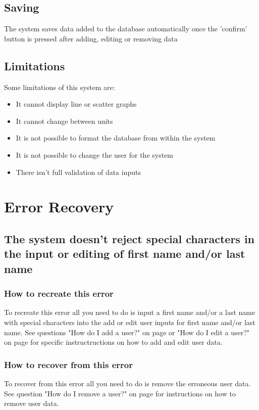 \subsection{Saving}
The system saves data added to the database automatically once the 'confirm' button is pressed after adding, editing or removing data

\subsection{Limitations}
Some limitations of this system are:
\begin{itemize}
	\item It cannot display line or scatter graphs
	\item It cannot change between units
	\item It is not possible to format the database from within the system
	\item It is not possible to change the user for the system
	\item There isn't full validation of data inputs
\end{itemize}

\section{Error Recovery}

\subsection{The system doesn't  reject special characters in the input or editing of first name and/or last name}

\subsubsection{How to recreate this error}
To recreate this error all you need to do is input a first name and/or a last name with special characters into the add or edit user inputs for first name and/or last name.
See questions "How do I add a user?" on page \pageref{question:add_user} or "How do I edit a user?" on page \pageref{question:edit_user} for specific instructructions on how to add and edit user data.

\subsubsection{How to recover from this error}
To recover from this error all you need to do is remove the erroneous user data.
See question "How do I remove a user?" on page \pageref{question:remove_user} for instructions on how to remove user data.

